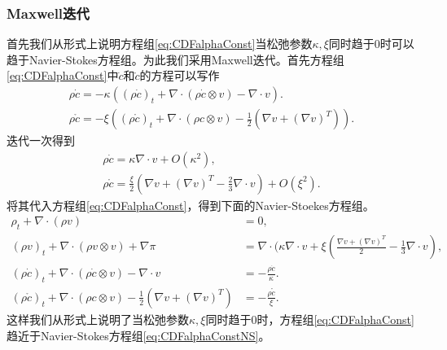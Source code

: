 	\subsubsection{Maxwell迭代}
	首先我们从形式上说明方程组\eqref{eq:CDFalphaConst}当松弛参数$\kappa,\xi$同时趋于$0$时可以趋于Navier-Stokes方程组。为此我们采用Maxwell迭代。首先方程组\eqref{eq:CDFalphaConst}中$\dot{c}$和$\mathring{c}$的方程可以写作
	\begin{eqnarray*}
			\rho \dot{c} = - \kappa \left( (\rho \dot{c})_t  + \nabla \cdot(\rho \dot{c} \otimes v) -  \nabla \cdot v  \right). \\
			\rho \mathring{c} = -\xi \left( (\rho \mathring{c})_t + \nabla \cdot (\rho c \otimes v) - \frac{1}{2} (\nabla v + (\nabla v)^T) \right).
	\end{eqnarray*}
	迭代一次得到
	\begin{eqnarray*}
		\rho \dot{c} = \kappa \nabla \cdot v + O(\kappa^2), \\
		\rho \mathring{c} =  \frac{\xi}{2}  (\nabla v + (\nabla v)^T - \frac{2}{3} \nabla \cdot v) + O(\xi^2).
	\end{eqnarray*}
	将其代入方程组\eqref{eq:CDFalphaConst}，得到下面的Navier-Stoekes方程组。
	\begin{subequations}\label{eq:CDFalphaConstNS}
		\begin{align}
			\rho_t + \nabla \cdot (\rho v) &=0, \\
			(\rho v)_t + \nabla \cdot (\rho v \otimes v) + \nabla \pi &= \nabla \cdot (\kappa \nabla \cdot v + \xi  (\frac{\nabla v + (\nabla v)^T}{2} - \frac{1}{3} \nabla \cdot v), \\
			(\rho \dot{c})_t  + \nabla \cdot(\rho \dot{c} \otimes v) -  \nabla \cdot v &= - \frac{\rho \dot{c}}{\kappa}. \\
			(\rho \mathring{c})_t + \nabla \cdot (\rho c \otimes v) - \frac{1}{2} (\nabla v + (\nabla v)^T) &= - \frac{\rho \mathring{c}}{\xi}.
		\end{align}
	\end{subequations}
	这样我们从形式上说明了当松弛参数$\kappa,\xi$同时趋于$0$时，方程组\eqref{eq:CDFalphaConst}趋近于Navier-Stokes方程组\eqref{eq:CDFalphaConstNS}。

